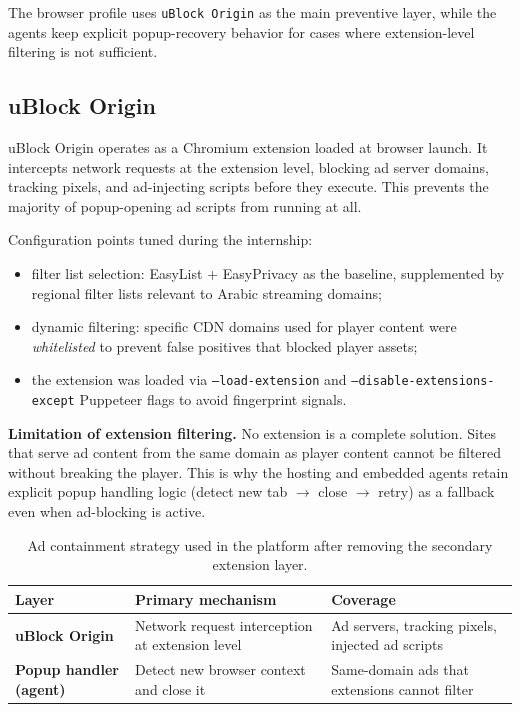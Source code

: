The browser profile uses \texttt{uBlock Origin} as the main preventive layer, while the
agents keep explicit popup-recovery behavior for cases where extension-level filtering is
not sufficient.

\subsection{uBlock Origin}

uBlock Origin operates as a Chromium extension loaded at browser launch. It intercepts
network requests at the extension level, blocking ad server domains, tracking pixels,
and ad-injecting scripts before they execute. This prevents the majority of popup-opening
ad scripts from running at all.

Configuration points tuned during the internship:
\begin{itemize}
  \item filter list selection: EasyList + EasyPrivacy as the baseline, supplemented by
    regional filter lists relevant to Arabic streaming domains;
  \item dynamic filtering: specific CDN domains used for player content were
    \emph{whitelisted} to prevent false positives that blocked player assets;
  \item the extension was loaded via \texttt{--load-extension} and
    \texttt{--disable-extensions-except} Puppeteer flags to avoid fingerprint signals.
\end{itemize}

\textbf{Limitation of extension filtering.} No extension is a complete solution. Sites
that serve ad content from the same domain as player content cannot be filtered without
breaking the player. This is why the hosting and embedded agents retain explicit popup
handling logic (detect new tab $\to$ close $\to$ retry) as a fallback even when
ad-blocking is active.

\begin{table}[H]
\centering
\begin{tabularx}{\textwidth}{>{\raggedright\arraybackslash\bfseries}p{2.8cm}
                              >{\raggedright\arraybackslash}X
                              >{\raggedright\arraybackslash}X}
\toprule
\rowcolor{accent!8}
Layer & Primary mechanism & Coverage \\
\midrule
uBlock Origin & Network request interception at extension level & Ad servers, tracking pixels, injected ad scripts \\
Popup handler (agent) & Detect new browser context and close it & Same-domain ads that extensions cannot filter \\
\bottomrule
\end{tabularx}
\caption{Ad containment strategy used in the platform after removing the secondary extension layer.}
\label{tab:adblock}
\end{table}

